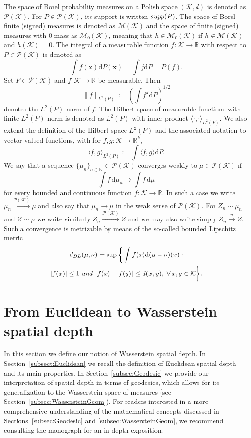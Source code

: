 \documentclass{imsart}
\numberwithin{equation}{section}
\def\N{\mathbb{N}}
\def\R{\mathbb{R}}
\def\x{\mathbf{x}}
\def\N{\mathbb N}
\def\x{\mathbf x}
\begin{document}
The space of Borel probability measures on a Polish space $(\mathcal{K},d)$ is denoted as 
$\mathcal{P}(\mathcal{K})$. 
For $P \in \mathcal{P}(\mathcal{K})$, its support is written ${\rm supp}( P )$.
The space of Borel finite (signed) measures is denoted as $\mathcal{M}(\mathcal{K})$ and the space of finite (signed)  measures with $0$ mass as $\mathcal{M}_0(\mathcal{K})$, meaning that 
$h\in \mathcal{M}_0(\mathcal{K})$ if $h\in \mathcal{M}(\mathcal{K})$ and $h(\mathcal{K})=0$. 
The integral of a measurable function $f:\mathcal{K} \to \R$ with respect to $P\in \mathcal{P}(\mathcal{K})$ is denoted as 
$$ \int f(\x) \mathrm{d} P(\x)= \int f \mathrm{d}P=P(f).$$
Set $P\in \mathcal{P}(\mathcal{K})$ and $f:\mathcal{K} \to \R$ be measurable. Then 
$$ \|f\|_{L^2(P)}:= \left(\int f^2 \mathrm{d}P \right)^{1/2}$$
denotes the $L^2(P)$-norm of $f$. 
The Hilbert space of measurable functions with finite $L^2(P)$-norm is denoted as $L^2(P)$
with inner product $\langle \cdot , \cdot \rangle_{L^2(P)}$.
We also extend the definition 
of the Hilbert space $L^2(P)$ and the associated notation 
to vector-valued functions, with for $f,g:\mathcal{K} \to \R^k$, 
$$
\langle
f,g
\rangle_{L^2(P)}:= \int \langle f, g \rangle \mathrm{d}P.
$$
We say that a sequence $\{\mu_n\}_{n\in \N}\subset \mathcal{P}(\mathcal{K})$ converges weakly to $\mu\in \mathcal{P}(\mathcal{K})$ if 
$$ \int f\, \mathrm{d}\mu_n \longrightarrow \int f\, \mathrm{d}\mu  $$
for every bounded and continuous function $f:\mathcal{K}\to \R$. In such a case we write $\mu_n\xrightarrow{\mathcal{P}(\mathcal{K})} \mu$ and also say that $\mu_n\rightarrow \mu$ in the weak sense of $\mathcal{P}(\mathcal{K})$.
For $Z_n \sim \mu_n$ and $Z \sim \mu$ we write similarly $Z_n\xrightarrow{\mathcal{P}(\mathcal{K})} Z$
and we may also write simply $Z_n\xrightarrow{w} Z$.
Such a convergence is metrizable by means of the so-called bounded Lipschitz metric \cite[p.\ 73]{vanderVaart1996}
\begin{multline*}
	d_{{\rm BL}}(\mu,\nu) 
	= \sup\bigg\{ \int f(x)\mathrm{d}(\mu-\nu)(x):   \\ |f(x)|\leq 1\ {\rm and}\ |f(x)-f(y) |\leq d(x,y), \ \forall \, x,y\in \mathcal{K}\bigg\}.  
\end{multline*}




\section{From Euclidean to Wasserstein  spatial depth}\label{method} 
In this section we define our notion of Wasserstein spatial depth. In Section~\ref{subsect:Euclidean} we recall the definition of Euclidean spatial depth and its main properties. In Section~\ref{subsec:Geodesic} we provide our interpretation of  spatial depth in terms of geodesics, which allows for its generalization to the Wasserstein space of measures (see Section~\ref{subsec:WassersteinGeom}). For readers interested in a more comprehensive understanding of the mathematical concepts discussed in Sections~\ref{subsec:Geodesic} and \ref{subsec:WassersteinGeom}, we recommend consulting the monograph \cite{AmbrosioGradient} for an in-depth exposition. 
\end{document}
